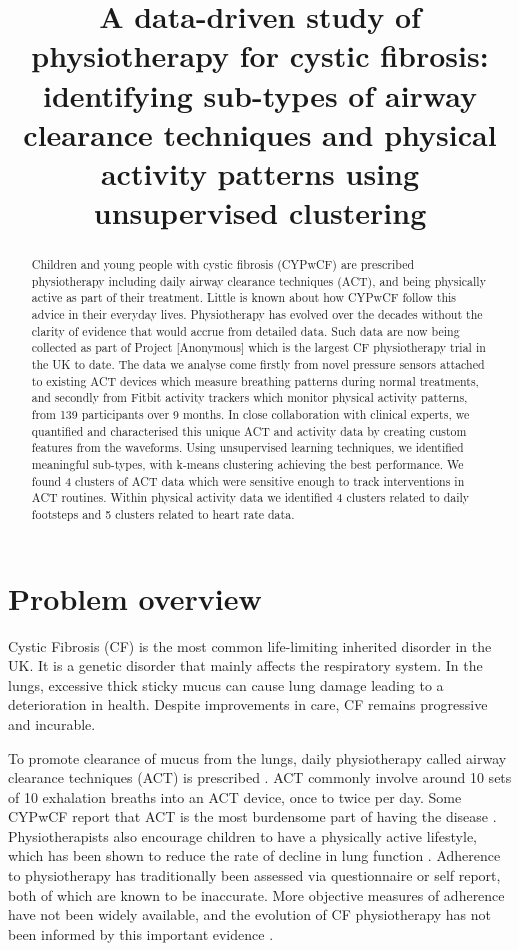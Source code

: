 \documentclass{article}
\title{A data-driven study of physiotherapy for cystic fibrosis: identifying sub-types of airway clearance techniques and physical activity patterns using unsupervised clustering}
\begin{document}
\maketitle

\begin{abstract}
  Children and young people with cystic fibrosis (CYPwCF) are prescribed physiotherapy including daily airway clearance techniques (ACT), and being physically active as part of their treatment. Little is known about how CYPwCF follow this advice in their everyday lives. Physiotherapy has evolved over the decades without the clarity of evidence that would accrue from detailed data. Such data are now being collected as part of Project [Anonymous] which is the largest CF physiotherapy trial in the UK to date. The data we analyse come firstly from novel pressure sensors attached to existing ACT devices which measure breathing patterns during normal treatments, and secondly from Fitbit activity trackers which monitor physical activity patterns, from 139 participants over 9 months. In close collaboration with clinical experts, we quantified and characterised this unique ACT and activity data by creating custom features from the waveforms. Using unsupervised learning techniques, we identified meaningful sub-types, with k-means clustering achieving the best performance. We found 4 clusters of ACT data which were sensitive enough to track interventions in ACT routines. Within physical activity data we identified 4 clusters related to daily footsteps and 5 clusters related to heart rate data.
\end{abstract}

\section{Problem overview}

Cystic Fibrosis (CF) is the most common life-limiting inherited disorder in the UK. It is a genetic disorder that mainly affects the respiratory system. In the lungs, excessive thick sticky mucus can cause lung damage leading to a deterioration in health. Despite improvements in care, CF remains progressive and incurable. 

To promote clearance of mucus from the lungs, daily physiotherapy called airway clearance techniques (ACT) is prescribed \cite{Daniels2017}. ACT commonly involve around 10 sets of 10 exhalation breaths into an ACT device, once to twice per day. Some CYPwCF report that ACT is the most burdensome part of having the disease \cite{JamesLindAlliance}. Physiotherapists also encourage children to have a physically active lifestyle, which has been shown to reduce the rate of decline in lung function \cite{Williams2014}. Adherence to physiotherapy has traditionally been assessed via questionnaire or self report, both of which are known to be inaccurate. More objective measures of adherence have not been widely available, and the evolution of CF physiotherapy has not been informed by this important evidence \cite{Modi2006}.  
\end{document}
